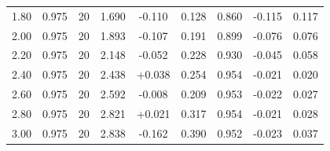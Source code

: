 \begin{longtable}{ccccccccc}
1.80 & 0.975 & 20 & 1.690 & -0.110 & 0.128 & 0.860 & -0.115 & 0.117 \\
2.00 & 0.975 & 20 & 1.893 & -0.107 & 0.191 & 0.899 & -0.076 & 0.076 \\
2.20 & 0.975 & 20 & 2.148 & -0.052 & 0.228 & 0.930 & -0.045 & 0.058 \\
2.40 & 0.975 & 20 & 2.438 & +0.038 & 0.254 & 0.954 & -0.021 & 0.020 \\
2.60 & 0.975 & 20 & 2.592 & -0.008 & 0.209 & 0.953 & -0.022 & 0.027 \\
2.80 & 0.975 & 20 & 2.821 & +0.021 & 0.317 & 0.954 & -0.021 & 0.028 \\
3.00 & 0.975 & 20 & 2.838 & -0.162 & 0.390 & 0.952 & -0.023 & 0.037 \\
\end{longtable}